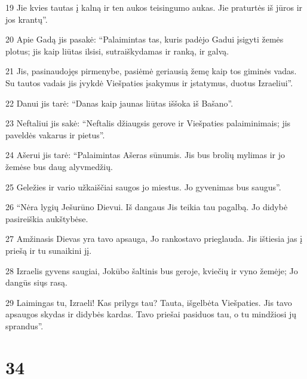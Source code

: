 \par 19 Jie kvies tautas į kalną ir ten aukos teisingumo aukas. Jie praturtės iš jūros ir jos krantų”. 
\par 20 Apie Gadą jis pasakė: “Palaimintas tas, kuris padėjo Gadui įsigyti žemės plotus; jis kaip liūtas ilsisi, sutraiškydamas ir ranką, ir galvą. 
\par 21 Jis, pasinaudojęs pirmenybe, pasiėmė geriausią žemę kaip tos giminės vadas. Su tautos vadais jis įvykdė Viešpaties įsakymus ir įstatymus, duotus Izraeliui”. 
\par 22 Danui jis tarė: “Danas kaip jaunas liūtas iššoka iš Bašano”. 
\par 23 Neftaliui jis sakė: “Neftalis džiaugsis gerove ir Viešpaties palaiminimais; jis paveldės vakarus ir pietus”. 
\par 24 Ašerui jis tarė: “Palaimintas Ašeras sūnumis. Jis bus brolių mylimas ir jo žemėse bus daug alyvmedžių. 
\par 25 Geležies ir vario užkaiščiai saugos jo miestus. Jo gyvenimas bus saugus”. 
\par 26 “Nėra lygių Ješurūno Dievui. Iš dangaus Jis teikia tau pagalbą. Jo didybė pasireiškia aukštybėse. 
\par 27 Amžinasis Dievas yra tavo apsauga, Jo rankos­tavo prieglauda. Jis ištiesia jas į priešą ir tu sunaikini jį. 
\par 28 Izraelis gyvens saugiai, Jokūbo šaltinis bus geroje, kviečių ir vyno žemėje; Jo dangūs siųs rasą. 
\par 29 Laimingas tu, Izraeli! Kas prilygs tau? Tauta, išgelbėta Viešpaties. Jis tavo apsaugos skydas ir didybės kardas. Tavo priešai pasiduos tau, o tu mindžiosi jų sprandus”.



\chapter{34}


